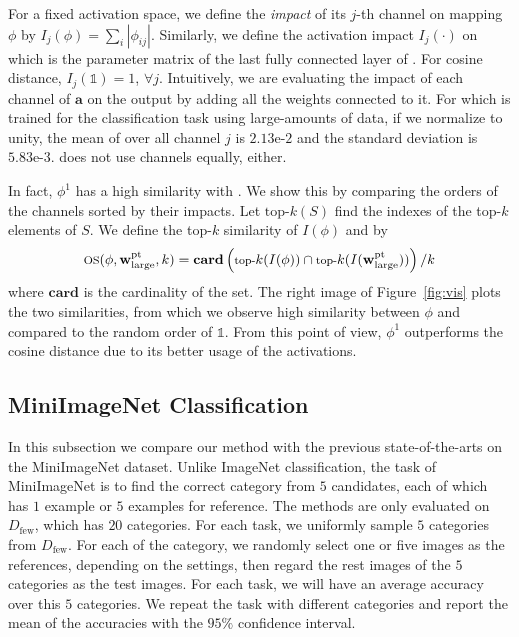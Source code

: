For a fixed activation space, we define the \emph{impact} of its $j$-th channel on mapping $\phi$ by
$I_j(\phi)=\sum_i |\phi_{ij}|$.
Similarly, we define the activation impact $I_j(\cdot)$ on  which is the parameter matrix of the last fully connected layer of . For cosine distance, $I_j(\mathds{1})=1$, $\forall j$. Intuitively, we are evaluating the impact of each channel of $\mathbf{a}$ on the output by adding all the weights connected to it.
For  which is trained for the classification task using large-amounts of data, if we normalize  to unity,
the mean of  over all channel $j$ is $2.13\text{e-}2$ and the standard deviation is $5.83\text{e-}3$.
 does not use channels equally, either.

In fact, $\phi^1$ has a high similarity with . We show this by comparing the orders of the channels sorted by their impacts.
Let $\text{top-}k(S)$ find the indexes of the top-$k$ elements of $S$. We define the top-$k$ similarity of $I(\phi)$ and  by
\begin{equation}
  \footnotesize
  \text{OS}(\phi, \mathbf{w}_{\text{large}}^{\text{pt}}, k)=\mathbf{card}\left(\text{top-}k( I(\phi))\cap\text{top-}k(I(\mathbf{w}_{\text{large}}^{\text{pt}}))\right) / k
\end{equation}
where $\mathbf{card}$ is the cardinality of the set.
The right image of Figure~\ref{fig:vis} plots the two similarities, from which we observe high similarity between $\phi$ and  compared to the random order of $\mathds{1}$.
From this point of view, $\phi^1$ outperforms the cosine distance due to its better usage of the activations.

\subsection{MiniImageNet Classification}
In this subsection we compare our method with the previous state-of-the-arts on the MiniImageNet dataset.
Unlike ImageNet classification, the task of MiniImageNet is to find the correct category from $5$ candidates, each of which has $1$ example or $5$ examples for reference. The methods are only evaluated on $D_{\text{few}}$, which has $20$ categories.
For each task, we uniformly sample $5$ categories from $D_{\text{few}}$.
For each of the category, we randomly select one or five images as the references, depending on the settings, then regard the rest images of the $5$ categories as the test images.
For each task, we will have an average accuracy over this $5$ categories.
We repeat the task with different categories and report the mean of the accuracies with the $95\%$ confidence interval.

